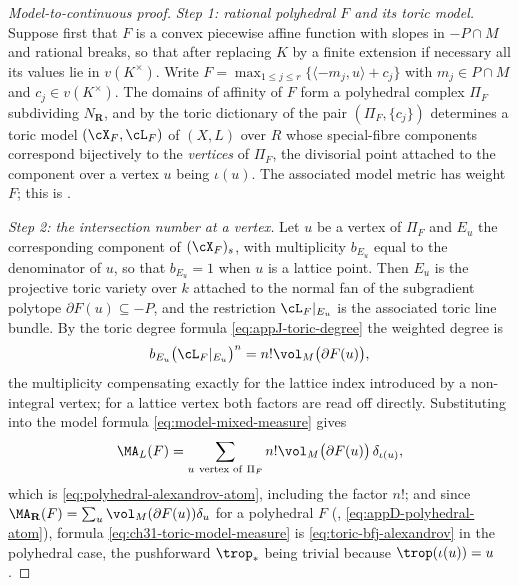 \begin{proof}[Model-to-continuous proof]
\emph{Step 1: rational polyhedral \(F\) and its toric model.}  Suppose
first that \(F\) is a convex piecewise affine function with slopes in
\(-P\cap M\) and rational breaks, so that after replacing \(K\) by a finite
extension if necessary all its values lie in \(v(K^\times)\).  Write
\(F=\max_{1\leq j\leq r}\{\langle -m_j,u\rangle+c_j\}\) with
\(m_j\in P\cap M\) and \(c_j\in v(K^\times)\).  The domains of affinity of
\(F\) form a polyhedral complex \(\Pi_F\) subdividing \(N_\mathbf R\), and
by the toric dictionary of  the pair
\((\Pi_F,\{c_j\})\) determines a toric model \((\cX_F,\cL_F)\) of
\((X,L)\) over \(R\) whose special-fibre components correspond bijectively
to the \emph{vertices} of \(\Pi_F\), the divisorial point attached to the
component over a vertex \(u\) being \(\iota(u)\).  The associated model
metric has weight \(F\); this is .

\emph{Step 2: the intersection number at a vertex.}  Let \(u\) be a vertex
of \(\Pi_F\) and \(E_u\) the corresponding component of \((\cX_F)_s\), with
multiplicity \(b_{E_u}\) equal to the denominator of \(u\), so that
\(b_{E_u}=1\) when \(u\) is a lattice point.  Then \(E_u\) is the
projective toric variety over \(k\) attached to the normal fan of the
subgradient polytope \(\partial F(u)\subseteq-P\), and the restriction
\(\cL_F|_{E_u}\) is the associated toric line bundle.  By the toric degree
formula \eqref{eq:appJ-toric-degree} the weighted degree is
\begin{equation}
\label{eq:ch31-toric-vertex-degree}
 b_{E_u}\bigl(\cL_F|_{E_u}\bigr)^n=n!\vol_M\bigl(\partial F(u)\bigr),
\end{equation}
the multiplicity compensating exactly for the lattice index introduced by a
non-integral vertex; for a lattice vertex both factors are read off
directly.  Substituting into the model formula
\eqref{eq:model-mixed-measure} gives
\begin{equation}
\label{eq:ch31-toric-model-measure}
 \MA_L(F)=\sum_{u\ \text{vertex of}\ \Pi_F}
      n!\vol_M\bigl(\partial F(u)\bigr)\,\delta_{\iota(u)},
\end{equation}
which is \eqref{eq:polyhedral-alexandrov-atom}, including the factor
\(n!\); and since \(\MA_{\mathbf R}(F)
 =\sum_u\vol_M(\partial F(u))\delta_u\) for a polyhedral \(F\)
(, \eqref{eq:appD-polyhedral-atom}),
formula \eqref{eq:ch31-toric-model-measure} is
\eqref{eq:toric-bfj-alexandrov} in the polyhedral case, the pushforward
\(\trop_*\) being trivial because \(\trop(\iota(u))=u\).


\end{proof}

